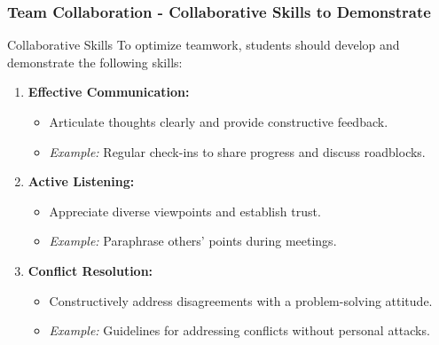 \documentclass[aspectratio=169]{beamer}
\begin{document}
\begin{frame}[fragile]
    \frametitle{Team Collaboration - Collaborative Skills to Demonstrate}
    
    \begin{block}{Collaborative Skills}
        To optimize teamwork, students should develop and demonstrate the following skills:
    \end{block}
    
    \begin{enumerate}
        \item \textbf{Effective Communication:}
            \begin{itemize}
                \item Articulate thoughts clearly and provide constructive feedback.
                \item \emph{Example:} Regular check-ins to share progress and discuss roadblocks.
            \end{itemize}
        \item \textbf{Active Listening:}
            \begin{itemize}
                \item Appreciate diverse viewpoints and establish trust.
                \item \emph{Example:} Paraphrase others' points during meetings.
            \end{itemize}
        \item \textbf{Conflict Resolution:}
            \begin{itemize}
                \item Constructively address disagreements with a problem-solving attitude.
                \item \emph{Example:} Guidelines for addressing conflicts without personal attacks.
            \end{itemize}
    \end{enumerate}
\end{frame}
\end{document}
